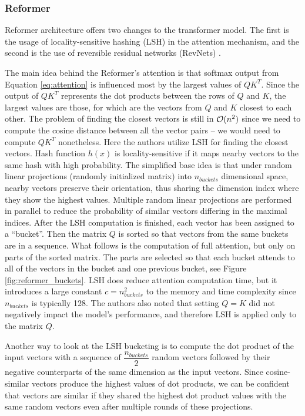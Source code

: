 \subsubsection{Reformer}

Reformer architecture \citep{reformer} offers two changes to the transformer model.
The first is the usage of locality-sensitive hashing (LSH) \citep{lsh} in the attention mechanism, and the second is the use of reversible residual networks (RevNets) \citep{revnets}.

The main idea behind the Reformer's attention is that softmax output from Equation \ref{eq:attention} is influenced most by the largest values of $QK^T$. 
Since the output of $QK^T$ represents the dot products between the rows of $Q$ and $K$, the largest values are those, for which are the vectors from $Q$ and $K$ closest to each other.
The problem of finding the closest vectors is still in $\mathcal{O}(n^2)$ since we need to compute the cosine distance between all the vector pairs -- we would need to compute $QK^T$ nonetheless. %
Here the authors utilize LSH for finding the closest vectors.
Hash function $h(x)$ is locality-sensitive if it maps nearby vectors to the same hash with high probability. 
The simplified base idea is that under random linear projections (randomly initialized matrix) into $n_{buckets}$ dimensional space, nearby vectors preserve their orientation, thus sharing the dimension index where they show the highest values.
Multiple random linear projections are performed in parallel to reduce the probability of similar vectors differing in the maximal indices.
After the LSH computation is finished, each vector has been assigned to a ``bucket''.
Then the matrix $Q$ is sorted so that vectors from the same buckets are in a sequence.
What follows is the computation of full attention, but only on parts of the sorted matrix.
The parts are selected so that each bucket attends to all of the vectors in the bucket and one previous bucket, see Figure \ref{fig:reformer_buckets}.
LSH does reduce attention computation time, but it introduces a large constant $c=n_{buckets}^2$ to the memory and time complexity since $n_{buckets}$ is typically 128.
The authors also noted that setting $Q=K$ did not negatively impact the model's performance, and therefore LSH is applied only to the matrix $Q$.

Another way to look at the LSH bucketing is to compute the dot product of the input vectors with a sequence of $\dfrac{n_{buckets}}{2}$ random vectors followed by their negative counterparts of the same dimension as the input vectors.
Since cosine-similar vectors produce the highest values of dot products, we can be confident that vectors are similar if they shared the highest dot product values with the same random vectors even after multiple rounds of these projections.

